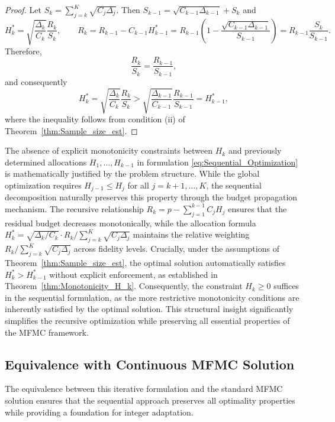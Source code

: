 \begin{proof}
Let $S_k = \sum_{j=k}^K \sqrt{C_j\Delta_j}$. Then $S_{k-1} = \sqrt{C_{k-1}\Delta_{k-1}} + S_k$ and 
\begin{equation*}
H_k^* = \sqrt{\frac{\Delta_k}{C_k}}\frac{R_k}{S_k},\qquad R_k = R_{k-1} - C_{k-1}H_{k-1}^* = R_{k-1}\left(1 - \frac{\sqrt{C_{k-1}\Delta_{k-1}}}{S_{k-1}}\right) = R_{k-1}\frac{S_k}{S_{k-1}}.
\end{equation*}
Therefore, 
\[
\frac{R_k}{S_k} = \frac{R_{k-1}}{S_{k-1}},
\]
and consequently
\[
H_k^* = \sqrt{\frac{\Delta_k}{C_k}}\frac{R_k}{S_k} > \sqrt{\frac{\Delta_{k-1}}{C_{k-1}}}\frac{R_{k-1}}{S_{k-1}} = H_{k-1}^*,
\]
where the inequality follows from condition (ii) of Theorem~\ref{thm:Sample_size_est}.
\end{proof}

The absence of explicit monotonicity constraints between $H_k$ and previously determined allocations $H_1, \ldots, H_{k-1}$ in formulation \eqref{eq:Sequential_Optimization} is mathematically justified by the problem structure. While the global optimization requires $H_{j-1} \le H_j$ for all $j=k+1,\ldots,K$, the sequential decomposition naturally preserves this property through the budget propagation mechanism. The recursive relationship $R_k = p - \sum_{j=1}^{k-1} C_j H_j$ ensures that the residual budget decreases monotonically, while the allocation formula $H_k^* = \sqrt{\Delta_k/C_k} \cdot R_k / \sum_{j=k}^K \sqrt{C_j\Delta_j}$ maintains the relative weighting $R_k / \sum_{j=k}^K \sqrt{C_j\Delta_j}$ across fidelity levels. Crucially, under the assumptions of Theorem~\ref{thm:Sample_size_est}, the optimal solution automatically satisfies $H_k^* > H_{k-1}^*$ without explicit enforcement, as established in Theorem~\ref{thm:Monotonicity_H_k}. Consequently, the constraint $H_k \ge 0$ suffices in the sequential formulation, as the more restrictive monotonicity conditions are inherently satisfied by the optimal solution. This structural insight significantly simplifies the recursive optimization while preserving all essential properties of the MFMC framework.

\subsection{Equivalence with Continuous MFMC Solution}

The equivalence between this iterative formulation and the standard MFMC solution ensures that the sequential approach preserves all optimality properties while providing a foundation for integer adaptation.

